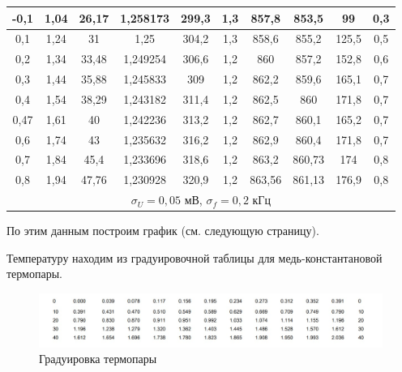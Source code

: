 \documentclass[a4paper, 12pt]{article}%
\begin{document}
\begin{table}[h]
\begin{tabular}{|c|c|c|c|c|c|c|c|c|c|}
-0,1            & 1,04  & 26,17 & 1,258173      & 299,3 & 1,3           & 857,8      & 853,5   & 99                      & 0,3                              \\ \hline
0,1             & 1,24  & 31    & 1,25          & 304,2 & 1,3           & 858,6      & 855,2   & 125,5                   & 0,5                              \\ \hline
0,2             & 1,34  & 33,48 & 1,249254      & 306,6 & 1,2           & 860        & 857,2   & 152,8                   & 0,6                              \\ \hline
0,3             & 1,44  & 35,88 & 1,245833      & 309   & 1,2           & 862,2      & 859,6   & 165,1                   & 0,7                              \\ \hline
0,4             & 1,54  & 38,29 & 1,243182      & 311,4 & 1,2           & 862,5      & 860     & 171,8                   & 0,7                              \\ \hline
0,47            & 1,61  & 40    & 1,242236      & 313,2 & 1,2           & 862,7      & 860,1   & 165,2                   & 0,7                              \\ \hline
0,6             & 1,74  & 43    & 1,235632      & 316,2 & 1,2           & 862,9      & 860,4   & 171,8                   & 0,7                              \\ \hline
0,7             & 1,84  & 45,4  & 1,233696      & 318,6 & 1,2           & 863,2      & 860,73  & 174                     & 0,8                              \\ \hline
0,8             & 1,94  & 47,76 & 1,230928      & 320,9 & 1,2           & 863,56     & 861,13  & 176,9                   & 0,8                              \\ \hline
\multicolumn{10}{|c|}{$\sigma_U = 0,05$ мВ, $\sigma_f = 0,2$ кГц}                                                                                           \\ \hline
\end{tabular}
\end{table}
По этим данным построим график (см. следующую страницу).

Температуру находим из градуировочной таблицы для медь-константановой термопары.
\begin{figure}[h]
\begin{center}
\includegraphics[width = \textwidth]{6.jpg}
\caption{Градуировка термопары}
\end{center}
\end{figure}
\end{document}
